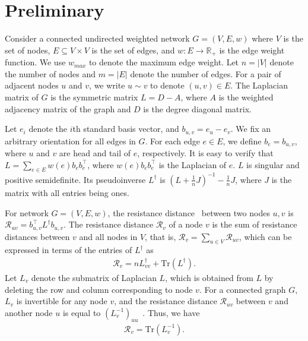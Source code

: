 \documentclass{article}
\def\kh#1{\left( #1 \right)}
\newcommand{\rea}{\mathbb{R}}
\newcommand\xx{\boldsymbol{\mathit{x}}}
\newcommand\bb{\boldsymbol{\mathit{b}}}
\newcommand\ee{\boldsymbol{\mathit{e}}}
\newcommand\LL{\bm{\mathit{L}}}
\renewcommand\AA{\boldsymbol{\mathit{A}}}
\newcommand\JJ{\boldsymbol{\mathit{J}}}
\newcommand\DD{\boldsymbol{\mathit{D}}}
\def\trace#1{\mathrm{Tr} \left(#1 \right)}
\begin{document}
\section{Preliminary}
Consider a connected undirected weighted network $G = (V,E,w)$ where $V$ is the set of nodes, $E \subseteq V \times V$ is the set of edges, and $w : E \to \rea_{+}$ is the edge weight function. We use $w_{max}$ to denote the maximum edge weight.
Let $n = |V|$ denote the number of nodes and $m = |E|$ denote the number of edges. For a pair of adjacent nodes $u$ and $v$, we write $u\sim v$ to denote $(u,v) \in E$.
The Laplacian matrix of $G$ is the symmetric matrix $\LL = \DD - \AA$, where $\AA$ is the weighted adjacency matrix of the graph and $\DD$ is the degree diagonal matrix.

Let $\ee_i$ denote the $i$th standard basis vector, and $\bb_{u,v} = \ee_u - \ee_v$.
We fix an arbitrary orientation for all edges in $G$.
For each edge $e\in E$, we define $\bb_e = \bb_{u,v}$, where $u$ and $v$
are head and tail of $e$, respectively. It is easy to verify that $\LL = \sum\nolimits_{e\in E} w(e)\bb_e \bb_e^\top$, where $w(e)\bb_e \bb_e^\top$ is the Laplacian of $e$. $\LL$ is  singular and positive semidefinite. Its pseudoinverse $\LL^\dag$ is $\kh{\LL +\frac{1}{n}\JJ}^{-1} - \frac{1}{n}\JJ$, where $\JJ$ is the matrix with all entries being ones.


For network $G = (V,E,w)$, the resistance distance~\cite{KlRa93} between two nodes $u,v$ is $\mathcal{R}_{uv} = \bb_{u,v}^\top \LL^\dag \bb_{u,v}$. The  resistance distance $\mathcal{R}_v$ of a node $v$ is the sum of resistance distances between  $v$ and all nodes in $V$, that is, $\mathcal{R}_v = \sum_{u \in V} \mathcal{R}_{uv}$, which can be expressed in terms of the entries of  $\LL^\dag$ as~\cite{BoFr13}
\begin{align}\label{eqR1}
\mathcal{R}_v = n \LL^\dag_{vv} + \trace{\LL^\dag}.
\end{align}
Let $\LL_v$ denote the submatrix of Laplacian $\LL$, which is obtained from $\LL$ by deleting the row and column corresponding to node $v$. For a connected graph $G$, $\LL_v$ is invertible for any node $v$,  and  the resistance distance $\mathcal{R}_{uv}$ between $v$ and another node $u$ is equal to $\kh{\LL_v^{-1}}_{uu}$~\cite{INK+13}. Thus, we have
\begin{align}\label{eqR2}
\mathcal{R}_v = \trace{\LL_v^{-1}}.
\end{align}
\end{document}
